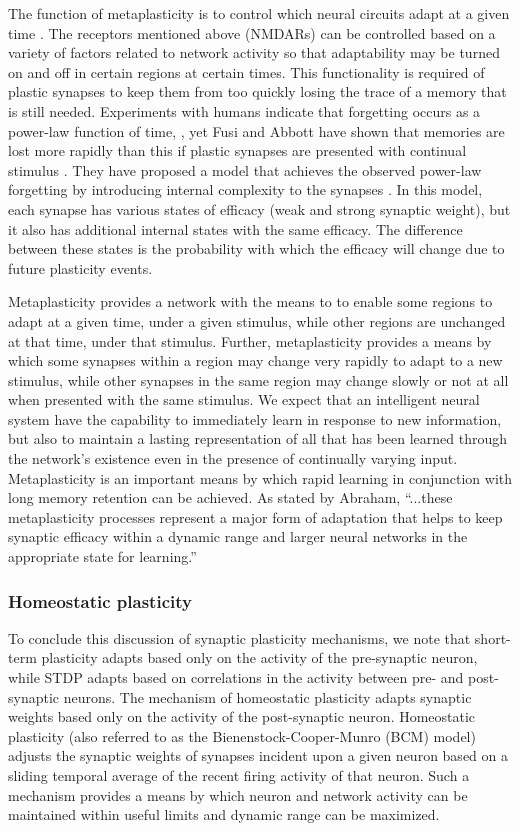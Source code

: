 \documentclass[twocolumn]{article}
\begin{document}
The function of metaplasticity is to control which neural circuits adapt at a given time \cite{ab2008}. The receptors mentioned above (NMDARs) can be controlled based on a variety of factors related to network activity so that adaptability may be turned on and off in certain regions at certain times. This functionality is required of plastic synapses to keep them from too quickly losing the trace of a memory that is still needed. Experiments with humans indicate that forgetting occurs as a power-law function of time, \citep{wieb1991,wieb1997}, yet Fusi and Abbott have shown that memories are lost more rapidly than this if plastic synapses are presented with continual stimulus \cite{fuab2007}. They have proposed a model that achieves the observed power-law forgetting by introducing internal complexity to the synapses \cite{fudr2005}. In this model, each synapse has various states of efficacy (weak and strong synaptic weight), but it also has additional internal states with the same efficacy. The difference between these states is the probability with which the efficacy will change due to future plasticity events. 

Metaplasticity provides a network with the means to to enable some regions to adapt at a given time, under a given stimulus, while other regions are unchanged at that time, under that stimulus. Further, metaplasticity provides a means by which some synapses within a region may change very rapidly to adapt to a new stimulus, while other synapses in the same region may change slowly or not at all when presented with the same stimulus. We expect that an intelligent neural system have the capability to immediately learn in response to new information, but also to maintain a lasting representation of all that has been learned through the network's existence even in the presence of continually varying input. Metaplasticity is an important means by which rapid learning in conjunction with long memory retention can be achieved. As stated by Abraham, ``...these metaplasticity processes represent a major form of adaptation that helps to keep synaptic efficacy within a dynamic range and larger neural networks in the appropriate state for learning.''

\subsubsection{Homeostatic plasticity}
To conclude this discussion of synaptic plasticity mechanisms, we note that short-term plasticity adapts based only on the activity of the pre-synaptic neuron, while STDP adapts based on correlations in the activity between pre- and post-synaptic neurons. The mechanism of homeostatic plasticity \cite{cube2012} adapts synaptic weights based only on the activity of the post-synaptic neuron. Homeostatic plasticity (also referred to as the Bienenstock-Cooper-Munro (BCM) model) adjusts the synaptic weights of synapses incident upon a given neuron based on a sliding temporal average of the recent firing activity of that neuron. Such a mechanism provides a means by which neuron and network activity can be maintained within useful limits and dynamic range can be maximized.
\end{document}
